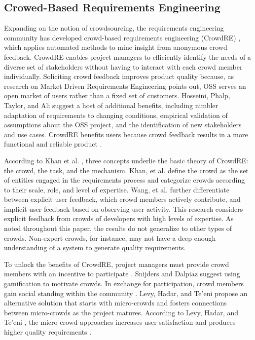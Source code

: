 \subsection{Crowed-Based Requirements Engineering}
\label{crowd_based_re}

Expanding on the notion of crowdsourcing, the requirements engineering community has developed crowd-based requirements engineering (CrowdRE) \cite{groen}, which applies automated methods to mine insight from anonymous crowd feedback. CrowdRE \cite{groen} enables project managers to efficiently identify the needs of a diverse set of stakeholders without having to interact with each crowd member individually. Soliciting crowd feedback improves product quality because, as research on Market Driven Requirements Engineering \cite{regnell} points out, OSS serves an open market of users rather than a fixed set of customers. Hosseini, Phalp, Taylor, and Ali \cite{hosseini} suggest a host of additional benefits, including nimbler adaptation of requirements to changing conditions, empirical validation of assumptions about the OSS project, and the identification of new stakeholders and use cases. CrowdRE benefits users because crowd feedback results in a more functional and reliable product \cite{groen}.

According to Khan et al. \cite{khan}, three concepts underlie the basic theory of CrowdRE: the crowd, the task, and the mechanism. Khan, et al. \cite{khan} define the crowd as the set of entities engaged in the requirements process and categorize crowds according to their scale, role, and level of expertise. Wang, et al. \cite{wang} further differentiate between explicit user feedback, which crowd members actively contribute, and implicit user feedback based on observing user activity. This research considers explicit feedback from crowds of developers with high levels of expertise. As noted throughout this paper, the results do not generalize to other types of crowds. Non-expert crowds, for instance, may not have a deep enough understanding of a system to generate quality requirements.

To unlock the benefits of CrowdRE, project managers must provide crowd members with an incentive to participate \cite{groen}. Snijders and Dalpiaz \cite{snijders, snijders2} suggest using gamification to motivate crowds. In exchange for participation, crowd members gain social standing within the community \cite{snijders, snijders2}. Levy, Hadar, and Te'eni \cite{levy} propose an alternative solution that starts with micro-crowds and fosters connections between micro-crowds as the project matures. According to Levy, Hadar, and Te'eni \cite{levy}, the micro-crowd approaches increases user satisfaction and produces higher quality requirements \cite{levy}.

